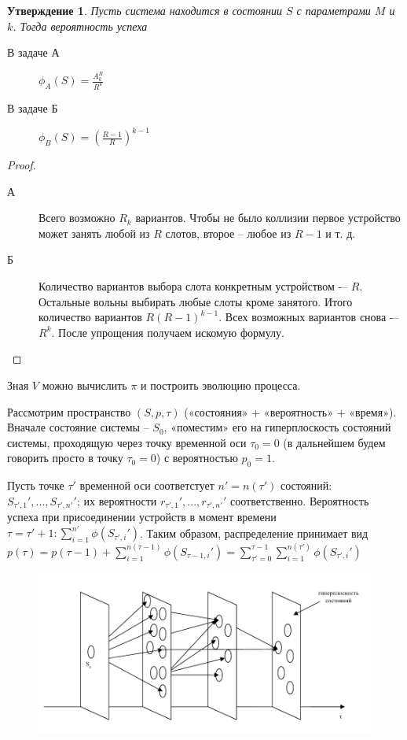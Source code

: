 \newtheorem{wimedia2}{Утверждение}
\begin{wimedia2}
Пусть система находится в состоянии $S$ с параметрами $M$ и $k$. Тогда вероятность успеха
\begin{description}
\item[В задаче А] $\phi_A(S) = \frac{A_{k}^{R}}{R^{k}}$
\item[В задаче Б] $\phi_B(S) = \left(\frac{R-1}{R}\right)^{k-1}$
\end{description}
\end{wimedia2}

\begin{proof}
\begin{description}
\item[А] Всего возможно $R_{k}$ вариантов. Чтобы не было коллизии первое устройство может занять любой из $R$ слотов, второе – любое из $R-1$ и т. д.
\item[Б] Количество вариантов выбора слота конкретным устройством -– $R$. Остальные вольны выбирать любые слоты кроме занятого. Итого количество вариантов $R(R-1)^{k-1}$. Всех возможных вариантов снова -– $R^{k}$. После упрощения получаем искомую формулу.
\end{description}
\end{proof}

Зная $V$ можно вычислить $\pi$ и построить эволюцию процесса.

Рассмотрим пространство $(S, p,\tau)$ («состояния» + «вероятность» + «время»). Вначале состояние системы -- $S_0$, «поместим» его на гиперплоскость состояний системы, проходящую через точку временной оси $\tau_0 = 0$ (в дальнейшем будем говорить просто в точку $\tau_0 = 0$) с вероятностью $p_0 = 1$.

Пусть точке $\tau'$ временной оси соответстует $n' = n(\tau')$ состояний: $S_{\tau', 1}',...,S_{\tau', n'}'$; их вероятности $r_{\tau', 1}',...,r_{\tau', n'}'$ соответственно. Вероятность успеха при присоединении устройств в момент времени $\tau = \tau'+1: \sum_{i=1}^{n'} \phi(S_{\tau', i}')$. Таким образом, распределение принимает вид $p(\tau) = p(\tau - 1) + \sum_{i=1}^{n(\tau-1)} \phi(S_{\tau-1, i}') = \sum_{\tau' = 0}^{\tau - 1} \sum_{i = 1}^{n(\tau')} \phi(S_{\tau', i}')$

\begin{figure}[h]
\includegraphics[width=\textwidth]{Wimedia1.pdf}
\end{figure}

